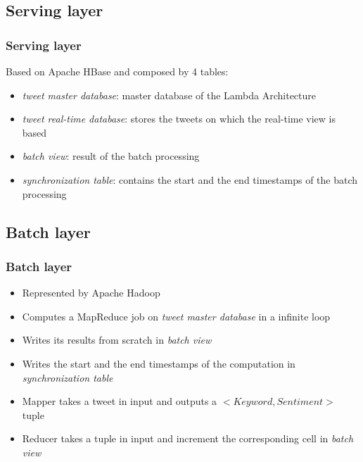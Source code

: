 \documentclass[xcolor=table, unknownkeysallowed]{beamer}
\begin{document}

\subsection{Serving layer}

\begin{frame}
\frametitle{Serving layer}

Based on Apache HBase and composed by 4 tables:
\vspace{0.5cm}
\begin{itemize}
\item \emph{tweet master database}: master database of the Lambda Architecture
\vspace{0.25cm}
\item \emph{tweet real-time database}: stores the tweets on which the real-time view is based
\vspace{0.25cm}
\item \emph{batch view}: result of the batch processing
\vspace{0.25cm}
\item \emph{synchronization table}: contains the start and the end timestamps of the batch processing
\end{itemize}
\end{frame}


\subsection{Batch layer}

\begin{frame}
\frametitle{Batch layer}

\begin{itemize}
\item Represented by Apache Hadoop
\vspace{0.15cm}
\item Computes a MapReduce job on \emph{tweet master database} in a infinite loop
\vspace{0.15cm}
\item Writes its results from scratch in \emph{batch view}
\vspace{0.15cm}
\item Writes the start and the end timestamps of the computation in \emph{synchronization table}
\vspace{0.15cm}
\item Mapper takes a tweet in input and outputs a $<Keyword, Sentiment>$ tuple
\vspace{0.15cm}
\item Reducer takes a tuple in input and increment the corresponding cell in \emph{batch view}
\end{itemize}
\end{frame}
\end{document}
